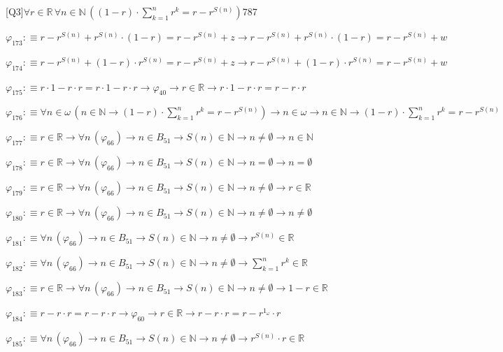 \begin{fullproof}{[Q3]}{$\forall r \in \mathbb{R}\,\forall n \in \mathbb{N}\,((1 - r) \cdot {\textstyle\sum_{k=1}^{n} {{r}^{k}}} = r - {{r}^{S(n)}})$}{787}
\begin{abbrevlist}
\item $\varphi_{173} :\equiv r - {{r}^{S(n)}} + {{r}^{S(n)}} \cdot (1 - r) = r - {{r}^{S(n)}} + z \to r - {{r}^{S(n)}} + {{r}^{S(n)}} \cdot (1 - r) = r - {{r}^{S(n)}} + w$
\item $\varphi_{174} :\equiv r - {{r}^{S(n)}} + (1 - r) \cdot {{r}^{S(n)}} = r - {{r}^{S(n)}} + z \to r - {{r}^{S(n)}} + (1 - r) \cdot {{r}^{S(n)}} = r - {{r}^{S(n)}} + w$
\item $\varphi_{175} :\equiv r \cdot 1 - r \cdot r = r \cdot 1 - r \cdot r \to \varphi_{40} \to r \in \mathbb{R} \to r \cdot 1 - r \cdot r = r - r \cdot r$
\item $\varphi_{176} :\equiv \forall n \in \omega\,(n \in \mathbb{N} \to (1 - r) \cdot {\textstyle\sum_{k=1}^{n} {{r}^{k}}} = r - {{r}^{S(n)}}) \to n \in \omega \to n \in \mathbb{N} \to (1 - r) \cdot {\textstyle\sum_{k=1}^{n} {{r}^{k}}} = r - {{r}^{S(n)}}$
\item $\varphi_{177} :\equiv r \in \mathbb{R} \to \forall n\,(\varphi_{66}) \to n \in B_{51} \to S(n) \in \mathbb{N} \to n \neq \emptyset \to n \in \mathbb{N}$
\item $\varphi_{178} :\equiv r \in \mathbb{R} \to \forall n\,(\varphi_{66}) \to n \in B_{51} \to S(n) \in \mathbb{N} \to n = \emptyset \to n = \emptyset$
\item $\varphi_{179} :\equiv r \in \mathbb{R} \to \forall n\,(\varphi_{66}) \to n \in B_{51} \to S(n) \in \mathbb{N} \to n \neq \emptyset \to r \in \mathbb{R}$
\item $\varphi_{180} :\equiv r \in \mathbb{R} \to \forall n\,(\varphi_{66}) \to n \in B_{51} \to S(n) \in \mathbb{N} \to n \neq \emptyset \to n \neq \emptyset$
\item $\varphi_{181} :\equiv \forall n\,(\varphi_{66}) \to n \in B_{51} \to S(n) \in \mathbb{N} \to n \neq \emptyset \to {{r}^{S(n)}} \in \mathbb{R}$
\item $\varphi_{182} :\equiv \forall n\,(\varphi_{66}) \to n \in B_{51} \to S(n) \in \mathbb{N} \to n \neq \emptyset \to {\textstyle\sum_{k=1}^{n} {{r}^{k}}} \in \mathbb{R}$
\item $\varphi_{183} :\equiv r \in \mathbb{R} \to \forall n\,(\varphi_{66}) \to n \in B_{51} \to S(n) \in \mathbb{N} \to n \neq \emptyset \to 1 - r \in \mathbb{R}$
\item $\varphi_{184} :\equiv r - r \cdot r = r - r \cdot r \to \varphi_{60} \to r \in \mathbb{R} \to r - r \cdot r = r - {{r}^{1_{\omega}}} \cdot r$
\item $\varphi_{185} :\equiv \forall n\,(\varphi_{66}) \to n \in B_{51} \to S(n) \in \mathbb{N} \to n \neq \emptyset \to {{r}^{S(n)}} \cdot r \in \mathbb{R}$

\end{abbrevlist}
\end{fullproof}
